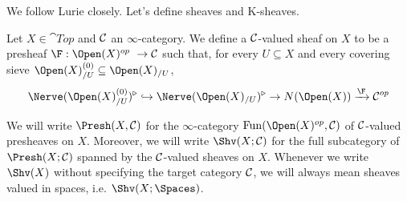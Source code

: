 \documentclass[../thesis.tex]{subfiles}
\begin{document}
We follow Lurie \cite{HTT} closely.
Let's define sheaves and K-sheaves.
\begin{definition}\label{sheaf_on_top}
    Let $X \in \cat{Top}$ and $\mathcal{C}$ an $\infty$-category.
    We define a $\mathcal{C}$-valued sheaf on $X$ to be a presheaf $\F: \Open(X)^{op} \to \C$ such that, for every $U\subseteq X$ and every covering sieve $\Open(X)_{/U}^{(0)} \subseteq \Open(X)_{/U}$,
    $$\Nerve(\Open(X)_{/U}^{(0)})^{\triangleright} \hookrightarrow \Nerve(\Open(X)_{/U})^{\triangleright} \rightarrow N(\Open(X))\xrightarrow{\F}\C^{op}$$
\end{definition}
We will write $\Presh(X, \C)$ for the $\infty$-category $\mathrm{Fun}(\Open(X)^{op}, \C)$ of $\mathcal{C}$-valued presheaves on $X$.
Moreover, we will write $\Shv(X;\C)$ for the full subcategory of $\Presh(X;\C)$ spanned by the $\mathcal{C}$-valued sheaves on $X$.
Whenever we write $\Shv(X)$ without specifying the target category $\mathcal{C}$, we will always mean sheaves valued in spaces, i.e. $\Shv(X;\Spaces)$.
\end{document}
